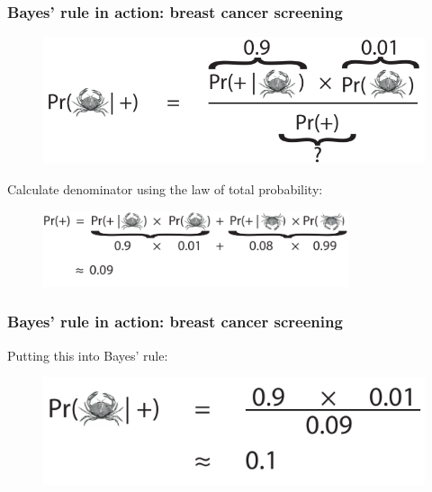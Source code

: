 \documentclass{beamer}
\begin{document}
	\begin{frame}
		\frametitle{Bayes' rule in action: breast cancer screening}
		
		\begin{figure}[ht]
			\includegraphics[width=1\textwidth]{./figures/lec1_cancer2.pdf}
		\end{figure}
	
		Calculate denominator using the law of total probability:
		
		\begin{figure}[ht]
			\includegraphics[width=0.8\textwidth]{./figures/lec1_cancer3.pdf}
		\end{figure}
		
	\end{frame}
	
	\begin{frame}
		\frametitle{Bayes' rule in action: breast cancer screening}
		Putting this into Bayes' rule:
		
		\begin{figure}[ht]
			\includegraphics[width=1\textwidth]{./figures/lec1_cancer4.pdf}
		\end{figure}
		
	\end{frame}
\end{document}
